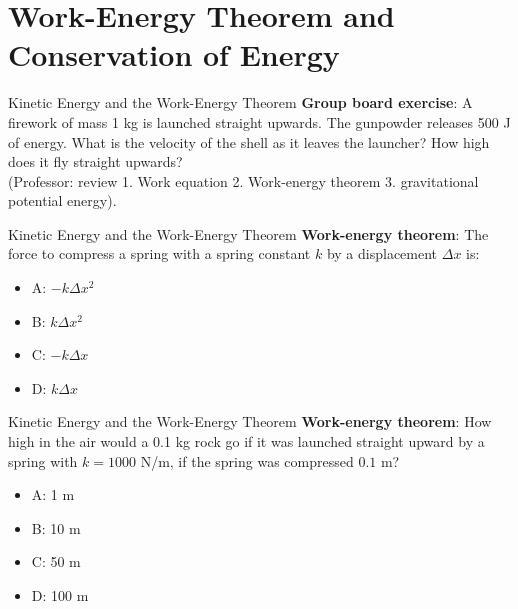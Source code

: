 \documentclass{beamer}
\begin{document}
\section{Work-Energy Theorem and Conservation of Energy}

\begin{frame}{Kinetic Energy and the Work-Energy Theorem}
\textbf{Group board exercise}: A firework of mass 1 kg is launched straight upwards.  The gunpowder releases 500 J of energy.  What is the velocity of the shell as it leaves the launcher?  How high does it fly straight upwards? \\ \vspace{0.5cm}
(Professor: review 1. Work equation 2. Work-energy theorem 3. gravitational potential energy).
\end{frame}

\begin{frame}{Kinetic Energy and the Work-Energy Theorem}
\textbf{Work-energy theorem}: The force to compress a spring with a spring constant $k$ by a displacement $\Delta x$ is:
\begin{itemize}
\item A: $-k \Delta x^2$
\item B: $k \Delta x^2$
\item C: $-k \Delta x$
\item D: $k \Delta x$
\end{itemize}
\end{frame}

\begin{frame}{Kinetic Energy and the Work-Energy Theorem}
\textbf{Work-energy theorem}: How high in the air would a 0.1 kg rock go if it was launched straight upward by a spring with $k=1000$ N/m, if the spring was compressed $0.1$ m?
\begin{itemize}
\item A: 1 m
\item B: 10 m
\item C: 50 m
\item D: 100 m
\end{itemize}
\end{frame}
\end{document}
